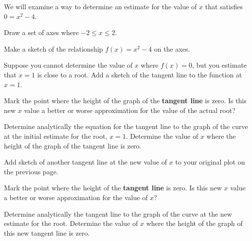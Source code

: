 \begin{problem}
\item We will examine a way to determine an estimate for the value of
  $x$ that satisfies $0=x^2-4$.
  \begin{subproblem}
  \item Draw a set of axes where $-2\leq x \leq 2$.


    \vfill

  \item Make a sketch of the relationship $f(x)=x^2-4$ on the axes.
  \item Suppose you cannot determine the value of $x$ where $f(x)=0$,
    but you estimate that $x=1$ is close to a root. Add a sketch of
    the tangent line to the function at $x=1$.

  \item Mark the point where the height of the graph of the
    \textbf{tangent line} is zero. Is this new $x$ value a better or
    worse approximation for the value of the actual root?

    \vspace{2em}

    \clearpage


  \item Determine analytically the equation for the tangent line to
    the graph of the curve at the initial estimate for the root,
    $x=1$. Determine the value of $x$ where the height of the graph of
    the tangent line is zero.

    \vfill


  \item Add sketch of another tangent line at the new value of $x$ to
    your original plot on the previous page.

  \item Mark the point where the height of the \textbf{tangent line}
    is zero. Is this new $x$ value a better or worse approximation for
    the value of $x$?

    \vspace{2em}

  \item Determine analytically the tangent line to the graph of the
    curve at the new estimate for the root. Determine the value of $x$
    where the height of the graph of this new tangent line is zero.


\end{subproblem}
\end{problem}
